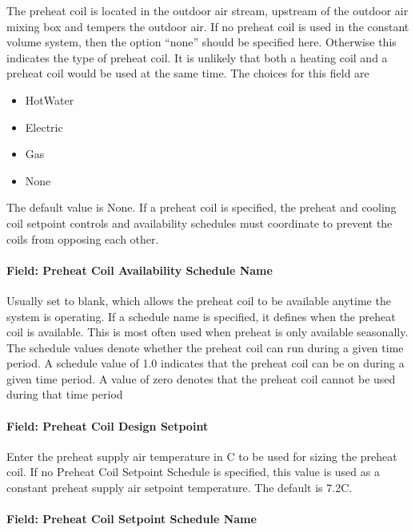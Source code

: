 The preheat coil is located in the outdoor air stream, upstream of the outdoor air mixing box and tempers the outdoor air. If no preheat coil is used in the constant volume system, then the option ``none'' should be specified here. Otherwise this indicates the type of preheat coil. It is unlikely that both a heating coil and a preheat coil would be used at the same time. The choices for this field are

\begin{itemize}
\item
  HotWater
\item
  Electric
\item
  Gas
\item
  None
\end{itemize}

The default value is None. If a preheat coil is specified, the preheat and cooling coil setpoint controls and availability schedules must coordinate to prevent the coils from opposing each other.

\paragraph{Field: Preheat Coil Availability Schedule Name}\label{field-preheat-coil-availability-schedule-name-2}

Usually set to blank, which allows the preheat coil to be available anytime the system is operating. If a schedule name is specified, it defines when the preheat coil is available. This is most often used when preheat is only available seasonally. The schedule values denote whether the preheat coil can run during a given time period. A schedule value of 1.0 indicates that the preheat coil can be on during a given time period. A value of zero denotes that the preheat coil cannot be used during that time period

\paragraph{Field: Preheat Coil Design Setpoint}\label{field-preheat-coil-design-setpoint-2}

Enter the preheat supply air temperature in C to be used for sizing the preheat coil. If no Preheat Coil Setpoint Schedule is specified, this value is used as a constant preheat supply air setpoint temperature. The default is 7.2C.

\paragraph{Field: Preheat Coil Setpoint Schedule Name}\label{field-preheat-coil-setpoint-schedule-name-2}

